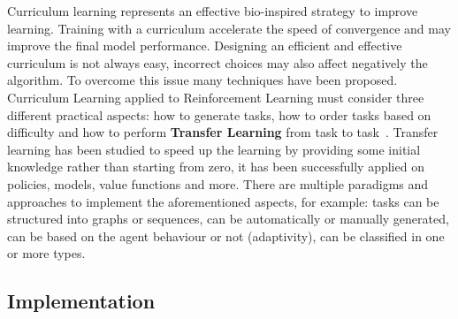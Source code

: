 \documentclass[11pt, a4paper, hidelinks]{report}
\begin{document}
Curriculum learning represents an effective bio-inspired strategy to improve learning.
Training with a curriculum accelerate the speed of convergence and may improve the final model performance.
Designing an efficient and effective curriculum is not always easy, incorrect choices may also affect negatively the algorithm.
To overcome this issue many techniques have been proposed.
Curriculum Learning applied to Reinforcement Learning must consider three different practical aspects: how to generate tasks, how to order tasks based on difficulty and how to perform \textbf{Transfer Learning} from task to task~\citep{narvekar2020curriculum}.
Transfer learning has been studied to speed up the learning by providing some initial knowledge rather than starting from zero, it has been successfully applied on policies, models, value functions and more.
There are multiple paradigms and approaches to implement the aforementioned aspects, for example: tasks can be structured into graphs or sequences, can be automatically or manually generated, can be based on the agent behaviour or not (adaptivity), can be classified in one or more types.

\subsection{Implementation}\label{subsec:implementation3}
\end{document}
